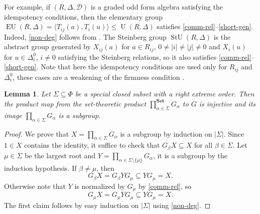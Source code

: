 \documentclass{article}
\newtheorem{lemma}{Lemma}
\theoremstyle{definition}
\DeclareMathOperator\unit{U}
\DeclareMathOperator\eunit{EU}
\DeclareMathOperator\stunit{StU}
\begin{document}
For example, if \(
    (R, \Delta, \mathcal D)
\) is a graded odd form algebra satisfying the idempotency conditions, then the elementary group \(
    \eunit(R, \Delta)
    =
    \langle T_{ij}(a), T_i(u) \rangle
    \leq
    \unit(R, \Delta)
\) satisfies \ref{comm-rel}--\ref{short-gen}. Indeed, \ref{non-deg} follows from \cite[lemma 10]{thesis}. The Steinberg group \(
    \stunit(R, \Delta)
\) is the abstract group generated by \(X_{ij}(a)\) for \(
    a \in R_{ij}
\), \(
    0 \neq |i| \neq |j| \neq 0
\) and \(X_i(u)\) for \(
    u \in \Delta^0_i
\), \(
    i \neq 0
\) satisfying the Steinberg relations, so it also satisfies \ref{comm-rel}--\ref{short-gen}. Note that here the idempotency conditions are used only for \(R_{ij}\) and \(\Delta^0_i\), these cases are a weakening of the firmness condition \cite[\S 3.3]{thesis}.

\begin{lemma} \label{unip-subgr}
    Let \(
        \Sigma \subseteq \Phi
    \) be a special closed subset with a right extreme order. Then the product map from the set-theoretic product \(
        \prod^{\mathbf{Set}}_{
            \alpha \in \Sigma
        } G_\alpha
    \) to \(G\) is injective and its image \(
        \prod_{\alpha \in \Sigma} G_\alpha
    \) is a subgroup.
\end{lemma}
\begin{proof}
    We prove that \(
        X = \prod_{\alpha \in \Sigma} G_\alpha
    \) is a subgroup by induction on \(|\Sigma|\). Since \(1 \in X\) contains the identity, it suffice to check that \(
        G_\beta X \subseteq X
    \) for all \(\beta \in \Sigma\). Let \(\mu \in \Sigma\) be the largest root and \(
        Y = \prod_{
            \alpha \in \Sigma \setminus \{\mu\}
        } G_\alpha
    \), it is a subgroup by the induction hypothesis. If \(\beta \neq \mu\), then \[
        G_\beta X =
        G_\beta Y G_\mu \subseteq
        Y G_\mu =
        X.
    \]
    Otherwise note that \(Y\) is normalized by \(G_\mu\) by \ref{comm-rel}, so \[
        G_\mu X =
        G_\mu Y G_\mu \subseteq
        Y G_\mu =
        X.
    \]
    The first claim follows by easy induction on \(|\Sigma|\) using \ref{non-deg}.
\end{proof}
\end{document}
